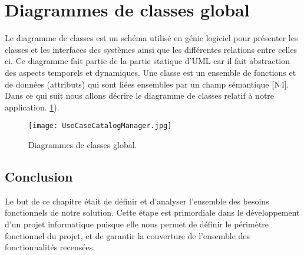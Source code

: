        
                   
\section{Diagrammes de classes global}
Le diagramme de classes est un schéma utilisé en génie logiciel pour présenter les classes et les interfaces des systèmes ainsi que les différentes relations entre celles ci. Ce diagramme fait
partie de la partie statique d’UML car il fait abstraction des aspects temporels et dynamiques.
Une classe est un ensemble de fonctions et de données (attributs) qui sont liées ensembles par un champ sémantique [N4]. Dans ce qui suit nous allons décrire le diagramme de classes relatif à notre application.
 \ref{fig:UseCaseCatalogManager}).
\begin{figure}[ht]
  \centering
  \texttt{[image: UseCaseCatalogManager.jpg]}
  \caption{Diagrammes de classes global.}
  \label{fig:UseCaseCatalogManager}
\end{figure}
\FloatBarrier






              
\subsection{Conclusion}
Le but de ce chapitre était de définir et d’analyser l’ensemble des besoins fonctionnels  de notre solution. Cette étape est primordiale dans le développement d’un projet informatique puisque elle nous permet de définir le périmètre fonctionnel du projet, et de garantir la couverture de l’ensemble des fonctionnalités recensées.
